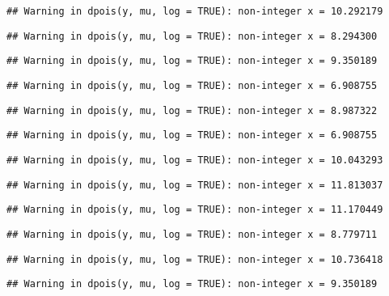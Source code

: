 \documentclass[
]{article}
\begin{document}
\begin{verbatim}
## Warning in dpois(y, mu, log = TRUE): non-integer x = 10.292179
\end{verbatim}

\begin{verbatim}
## Warning in dpois(y, mu, log = TRUE): non-integer x = 8.294300
\end{verbatim}

\begin{verbatim}
## Warning in dpois(y, mu, log = TRUE): non-integer x = 9.350189
\end{verbatim}

\begin{verbatim}
## Warning in dpois(y, mu, log = TRUE): non-integer x = 6.908755
\end{verbatim}

\begin{verbatim}
## Warning in dpois(y, mu, log = TRUE): non-integer x = 8.987322
\end{verbatim}

\begin{verbatim}
## Warning in dpois(y, mu, log = TRUE): non-integer x = 6.908755
\end{verbatim}

\begin{verbatim}
## Warning in dpois(y, mu, log = TRUE): non-integer x = 10.043293
\end{verbatim}

\begin{verbatim}
## Warning in dpois(y, mu, log = TRUE): non-integer x = 11.813037
\end{verbatim}

\begin{verbatim}
## Warning in dpois(y, mu, log = TRUE): non-integer x = 11.170449
\end{verbatim}

\begin{verbatim}
## Warning in dpois(y, mu, log = TRUE): non-integer x = 8.779711
\end{verbatim}

\begin{verbatim}
## Warning in dpois(y, mu, log = TRUE): non-integer x = 10.736418
\end{verbatim}

\begin{verbatim}
## Warning in dpois(y, mu, log = TRUE): non-integer x = 9.350189
\end{verbatim}
\end{document}
